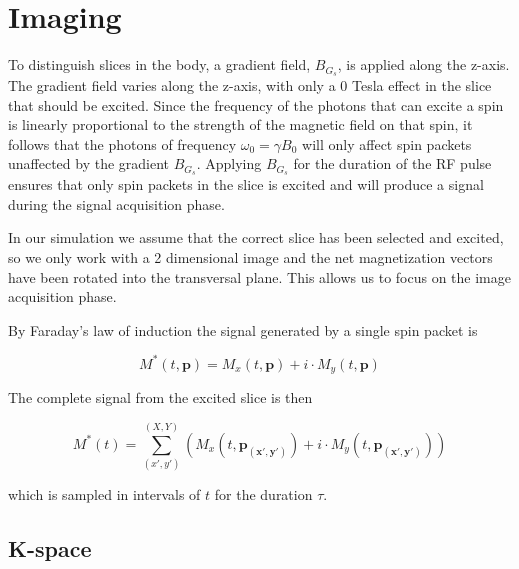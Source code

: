 \section{Imaging}



To distinguish slices in the body, a gradient field, $B_{G_s}$, is applied
along the z-axis. The gradient field varies along the z-axis, with
only a 0 Tesla effect in the slice that should be excited. Since the
frequency of the photons that can excite a spin is linearly
proportional to the strength of the magnetic field on that spin, it
follows that the photons of frequency $\omega_0 = \gamma B_0$ will
only affect spin packets unaffected by the gradient $B_{G_s}$. Applying
$B_{G_s}$ for the duration of the RF pulse ensures that only spin packets
in the slice is excited and will produce a signal during the signal
acquisition phase.

In our simulation we assume that the correct slice has been selected
and excited, so we only work with a 2 dimensional image and the net
magnetization vectors have been rotated into the transversal
plane. This allows us to focus on the image acquisition phase.


By Faraday's law of induction the signal generated by a single spin
packet is

\begin{displaymath}
  M^*(t, \mathbf{p}) = M_x(t, \mathbf{p}) + i \cdot M_y(t, \mathbf{p})
\end{displaymath}

The complete signal from the excited slice is then

\begin{displaymath}
    M^*(t) = \sum^{(X, Y)}_{(x',y')} (M_x(t, \mathbf{p_{(x',y')}}) + i \cdot M_y(t, \mathbf{p_{(x',y')}}))
\end{displaymath}

which is sampled in intervals of $t$ for the duration $\tau$.



\subsection{K-space}



